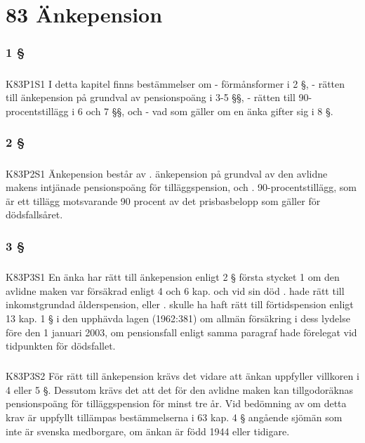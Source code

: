 \documentclass[a4paper,notitlepage,openany,10pt]{book}
\begin{document}
\chapter*{83 Änkepension}
\subsection*{1 §}
\paragraph*{}
{\tiny K83P1S1}
I detta kapitel finns bestämmelser om
\newline - förmånsformer i 2 §,
\newline - rätten till änkepension på grundval av pensionspoäng i 3-5 §§,
\newline - rätten till 90-procentstillägg i 6 och 7 §§, och
\newline - vad som gäller om en änka gifter sig i 8 §.
\subsection*{2 §}
\paragraph*{}
{\tiny K83P2S1}
Änkepension består av
. änkepension på grundval av den avlidne makens intjänade pensionspoäng för tilläggspension, och
. 90-procentstillägg, som är ett tillägg motsvarande 90 procent av det prisbasbelopp som gäller för dödsfallsåret.
\subsection*{3 §}
\paragraph*{}
{\tiny K83P3S1}
En änka har rätt till änkepension enligt 2 § första stycket 1 om den avlidne maken var försäkrad enligt 4 och 6 kap. och vid sin död
. hade rätt till inkomstgrundad ålderspension, eller
. skulle ha haft rätt till förtidspension enligt 13 kap. 1 § i den upphävda lagen (1962:381) om allmän försäkring i dess lydelse före den 1 januari 2003, om pensionsfall enligt samma paragraf hade förelegat vid tidpunkten för dödsfallet.
\paragraph*{}
{\tiny K83P3S2}
För rätt till änkepension krävs det vidare att änkan uppfyller villkoren i 4 eller 5 §. Dessutom krävs det att det för den avlidne maken kan tillgodoräknas pensionspoäng för tilläggspension för minst tre år. Vid bedömning av om detta krav är uppfyllt tillämpas bestämmelserna i 63 kap. 4 § angående sjömän som inte är svenska medborgare, om änkan är född 1944 eller tidigare.
\end{document}

